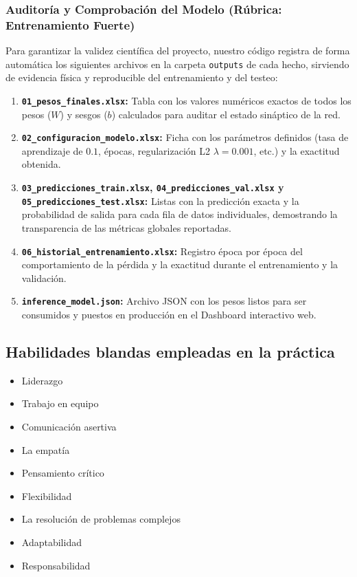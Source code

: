 \documentclass{article}
\begin{document}
\subsubsection{Auditoría y Comprobación del Modelo (Rúbrica: Entrenamiento Fuerte)}
Para garantizar la validez científica del proyecto, nuestro código registra de forma automática los siguientes archivos en la carpeta \texttt{outputs} de cada hecho, sirviendo de evidencia física y reproducible del entrenamiento y del testeo:
\begin{enumerate}
    \item \textbf{\texttt{01\_pesos\_finales.xlsx}:} Tabla con los valores numéricos exactos de todos los pesos ($W$) y sesgos ($b$) calculados para auditar el estado sináptico de la red.
    \item \textbf{\texttt{02\_configuracion\_modelo.xlsx}:} Ficha con los parámetros definidos (tasa de aprendizaje de $0.1$, épocas, regularización L2 $\lambda = 0.001$, etc.) y la exactitud obtenida.
    \item \textbf{\texttt{03\_predicciones\_train.xlsx}, \texttt{04\_predicciones\_val.xlsx} y \texttt{05\_predicciones\_test.xlsx}:} Listas con la predicción exacta y la probabilidad de salida para cada fila de datos individuales, demostrando la transparencia de las métricas globales reportadas.
    \item \textbf{\texttt{06\_historial\_entrenamiento.xlsx}:} Registro época por época del comportamiento de la pérdida y la exactitud durante el entrenamiento y la validación.
    \item \textbf{\texttt{inference\_model.json}:} Archivo JSON con los pesos listos para ser consumidos y puestos en producción en el Dashboard interactivo web.
\end{enumerate}

\subsection{Habilidades blandas empleadas en la práctica}
\begin{itemize}
    \item[$\blacksquare$] Liderazgo
    \item[$\blacksquare$] Trabajo en equipo
    \item[$\square$] Comunicación asertiva
    \item[$\square$] La empatía
    \item[$\blacksquare$] Pensamiento crítico
    \item[$\square$] Flexibilidad
    \item[$\blacksquare$] La resolución de problemas complejos
    \item[$\square$] Adaptabilidad
    \item[$\blacksquare$] Responsabilidad
\end{itemize}
\end{document}
